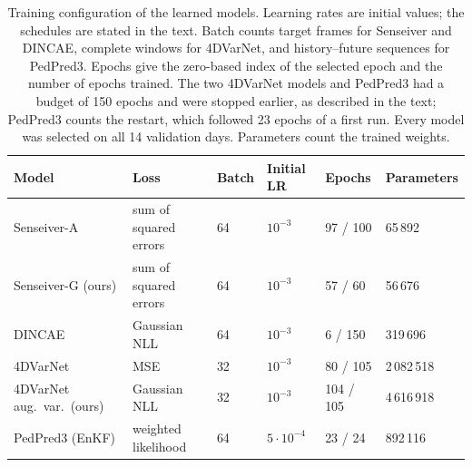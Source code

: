 \documentclass[english, 12pt, a4paper, elec, utf8, a-2b, online]{aaltothesis}
\begin{document}
\begin{table}[htb]
	\centering
	\caption{Training configuration of the learned models. Learning rates are
	initial values; the schedules are stated in the text. Batch counts target
	frames for Senseiver and DINCAE, complete windows for 4DVarNet, and
	history--future sequences for PedPred3. Epochs give the zero-based index of
	the selected epoch and the number of epochs trained. The two 4DVarNet models
	and PedPred3 had a budget of 150 epochs and were stopped earlier, as described
	in the text; PedPred3 counts the restart, which followed 23 epochs of a first
	run. Every model was selected on all 14 validation days. Parameters count the
	trained weights.}
	\label{tab:training}
	\small
	\setlength{\tabcolsep}{3pt}
	\begin{tabular}{llllll}
		\hline
		Model & Loss & Batch & Initial LR & Epochs & Parameters \\
		\hline
		Senseiver\nobreakdash-A          & sum of squared errors & 64 & $10^{-3}$ & 97 / 100 & 65\,892 \\
		Senseiver\nobreakdash-G (ours)   & sum of squared errors & 64 & $10^{-3}$ & 57 / 60 & 56\,676 \\
		DINCAE               & Gaussian NLL          & 64 & $10^{-3}$ & 6 / 150 & 319\,696 \\
		4DVarNet             & MSE                   & 32 & $10^{-3}$ & 80 / 105 & 2\,082\,518 \\
		4DVarNet aug.\ var.\ (ours) & Gaussian NLL          & 32 & $10^{-3}$ & 104 / 105 & 4\,616\,918 \\
		PedPred3 (EnKF)      & weighted likelihood          & 64 & $5 \cdot 10^{-4}$ & 23 / 24 & 892\,116 \\
		\hline
	\end{tabular}
\end{table}
\end{document}
